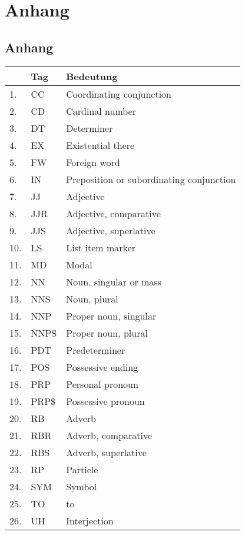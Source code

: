 
\appendix     
\part*{Anhang} %
   
    
\chapter{Anhang} 

\begin{table}[h!]
 
  \begin{tabular}{|l|l|l|} 
      \toprule
    & Tag & Bedeutung\\
    \midrule

     1. & CC & Coordinating conjunction \\
	 2. & CD & Cardinal number\\
	 3. & DT & Determiner \\
	4.&  EX &	Existential there\\
	5.&	FW &	Foreign word\\
	6.&	IN &	Preposition or subordinating conjunction\\
	7.&	JJ &	Adjective\\
	8.&	JJR &	Adjective, comparative\\
	9.&	JJS &	Adjective, superlative\\
	10.& LS &	List item marker\\
	11.& MD &	Modal\\
	12.& NN &	Noun, singular or mass\\
	13.& NNS &	Noun, plural\\
	14.& NNP &	Proper noun, singular\\
	15.& NNPS &	Proper noun, plural\\
	16.& PDT & Predeterminer\\
	17.& POS & Possessive ending\\
	18. & PRP & Personal pronoun \\
	19.& PRP\$ & Possessive pronoun\\
	20.& RB & Adverb\\
	21.& RBR & Adverb, comparative\\
	22.& RBS & Adverb, superlative\\
	23.& RP & Particle\\
	24.& SYM & Symbol\\
	25.& TO & to\\
	26.& UH & Interjection\\

\end{tabular}
\end{table}
